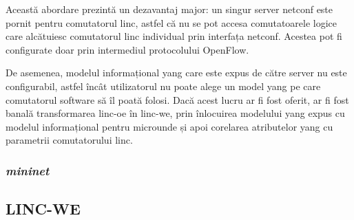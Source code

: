Această abordare prezintă un dezavantaj major: un singur server \gls{netconf} este pornit pentru comutatorul \gls{linc}, astfel că nu se pot accesa comutatoarele logice care alcătuiesc comutatorul \gls{linc} individual prin interfața \gls{netconf}. Acestea pot fi configurate doar prin intermediul protocolului OpenFlow.

De asemenea, modelul informațional \gls{yang} care este expus de către server nu este configurabil, astfel încât utilizatorul nu poate alege un model \gls{yang} pe care comutatorul software să îl poată folosi. Dacă acest lucru ar fi fost oferit, ar fi fost banală transformarea \gls{linc-oe} în \gls{linc-we}, prin înlocuirea modelului \gls{yang} expus cu modelul informațional pentru microunde și apoi corelarea atributelor \gls{yang} cu parametrii comutatorului \gls{linc}.

\subsubsection{\textit{mininet}}

\subsection{LINC-WE}